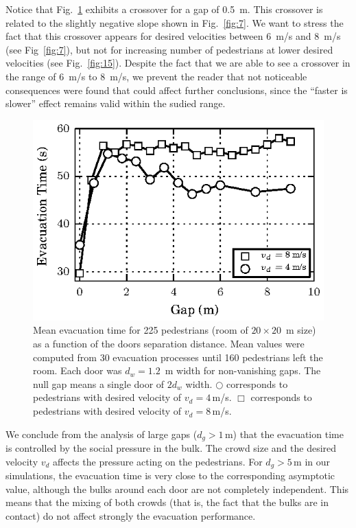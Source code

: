 {\color{red} Notice that Fig.~\ref{fig:12} exhibits a crossover for a gap of 0.5~m. This crossover is related to the slightly negative slope shown in Fig.~\ref{fig:7}. We want to stress the fact that this crossover appears for desired velocities between 6~m/s and 8~m/s (see  Fig~\ref{fig:7}), but not for increasing number of pedestrians at lower desired velocities (see Fig.~\ref{fig:15}). Despite the fact that we are able to see a crossover in the range of 6~m/s to 8~m/s, we prevent the reader that not noticeable consequences were found that could affect further conclusions, since the ``faster is slower'' effect remains valid within the sudied range.}\\


\begin{figure}
\includegraphics[width=\columnwidth]{./fig14.eps}
\caption{\label{fig:12} Mean evacuation time for 225 pedestrians (room of 
$20\times20$~m size) as a function of the doors separation distance. Mean 
values were computed from 30 evacuation processes until 160 pedestrians left 
the room. Each door was $d_w=1.2$~m width for non-vanishing gaps. The null gap 
means a single door of $2d_w$ width. $\bigcirc$ corresponds to pedestrians 
with desired velocity of $v_d=4\,$m/s. $\Box$ corresponds to pedestrians 
with desired velocity of $v_d=8\,$m/s. }
\end{figure}


We conclude from the analysis of large gaps ($d_g>1\,$m) that the evacuation 
time is controlled by the social pressure in the bulk. The crowd size and 
the desired velocity $v_d$ affects the pressure acting on the pedestrians. 
For $d_g>5\,$m in our simulations, the evacuation time is very close to the 
corresponding asymptotic value, although the bulks around each door are not 
completely independent. This means that the mixing of both crowds (that is, 
the fact that the bulks are in contact) do not affect strongly the evacuation 
performance.   \\





